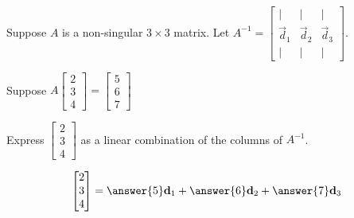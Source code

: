 \documentclass{ximera}
\author{}
\begin{document}
\begin{exercise}
Suppose $A$ is a non-singular $3\times 3$ matrix.  Let $A^{-1}=\begin{bmatrix}|&|&|\\\vec{d}_1& \vec{d}_2 & \vec{d}_3\\|&|&|\end{bmatrix}$.

Suppose $A\begin{bmatrix}2\\3\\4\end{bmatrix}=\begin{bmatrix}5\\6\\7\end{bmatrix}$

Express $\begin{bmatrix}2\\3\\4\end{bmatrix}$ as a linear combination of the columns of $A^{-1}$.

$$\begin{bmatrix}2\\3\\4\end{bmatrix}=\answer{5}\vec{d}_1+\answer{6}\vec{d}_2+\answer{7}\vec{d}_3$$
\end{exercise}
\end{document}
